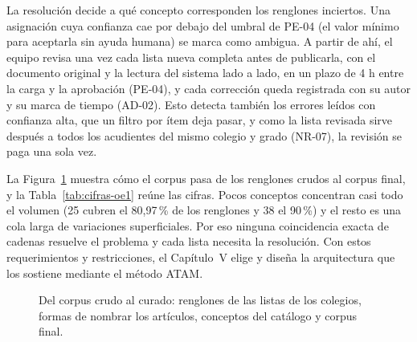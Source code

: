 La resolución decide a qué concepto corresponden los renglones inciertos. Una asignación cuya confianza cae por debajo del umbral de PE-04 (el valor mínimo para aceptarla sin ayuda humana) se marca como ambigua. A partir de ahí, el equipo revisa una vez cada lista nueva completa antes de publicarla, con el documento original y la lectura del sistema lado a lado, en un plazo de 4 h entre la carga y la aprobación (PE-04), y cada corrección queda registrada con su autor y su marca de tiempo (AD-02). Esto detecta también los errores leídos con confianza alta, que un filtro por ítem deja pasar, y como la lista revisada sirve después a todos los acudientes del mismo colegio y grado (NR-07), la revisión se paga una sola vez.

La Figura~\ref{fig:embudo-corpus} muestra cómo el corpus pasa de los renglones crudos al corpus final, y la Tabla~\ref{tab:cifras-oe1} reúne las cifras. Pocos conceptos concentran casi todo el volumen (25 cubren el 80,97\,\% de los renglones y 38 el 90\,\%) y el resto es una cola larga de variaciones superficiales. Por eso ninguna coincidencia exacta de cadenas resuelve el problema y cada lista necesita la resolución. Con estos requerimientos y restricciones, el Capítulo~V elige y diseña la arquitectura que los sostiene mediante el método ATAM.

\begin{figure}[!htb]
\centering
{}
\caption{Del corpus crudo al curado: renglones de las listas de los colegios, formas de nombrar los artículos, conceptos del catálogo y corpus final.}
\label{fig:embudo-corpus}
\end{figure}

